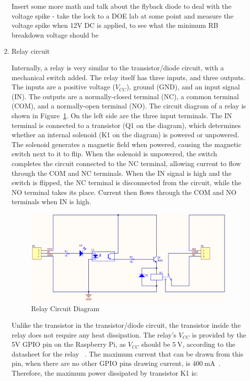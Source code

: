 \documentclass[12pt]{report}
\begin{document}
\begin{enumerate}
Insert some more math and talk about the flyback diode to deal with the voltage spike - take the lock to a DOE lab at 
some point and measure the voltage spike when 12V DC is applied, to see what the minimum RB breakdown voltage should be

\item Relay circuit

Internally, a relay is very similar to the transistor/diode circuit, with a mechanical switch added. The relay itself 
has three inputs, and three outputs. The inputs are a positive voltage ($ V_{CC} $), ground (GND), and an input signal 
(IN). The outputs are a normally-closed terminal (NC), a common terminal (COM), and a normally-open terminal (NO). The 
circuit diagram of a relay is shown in Figure~\ref{fig:relay-circuit-diagram}. On the left side are the three input 
terminals. The IN terminal is connected to a transistor (Q1 on the diagram), which determines whether an internal
solenoid (K1 on the diagram) is powered or unpowered. The solenoid generates a magnetic field when powered, causing the
magnetic switch next to it to flip. When the solenoid is unpowered, the switch completes the circuit connected to the 
NC terminal, allowing current to flow through the COM and NC terminals. When the IN signal is high and the switch is 
flipped, the NC terminal is disconnected from the circuit, while the NO terminal takes its place. Current then flows
through the COM and NO terminals when IN is high.

\begin{figure}
    \includegraphics[width=\textwidth]{Diagrams/relay_circuit}
    \caption{Relay Circuit Diagram~\autocite{RELAYCIRCUIT}}
    \label{fig:relay-circuit-diagram}
\end{figure}

Unlike the transistor in the transistor/diode circuit, the transistor inside the relay does not require any heat
dissipation. The relay's $V_{CC}$ is provided by the 5V GPIO pin on the Raspberry Pi, as $ V_{CC} $ should be 
$ \SI{5}{\volt} $, according to the datasheet for the relay ~\autocite{RELAYDETAILS}. The maximum current that can be
drawn from this pin, when there are no other GPIO pins drawing current, is $\SI{400}{\milli\ampere}$~\autocite{PIPOWER}.
Therefore, the maximum power dissipated by transistor K1 is:


\end{enumerate}
\end{document}
